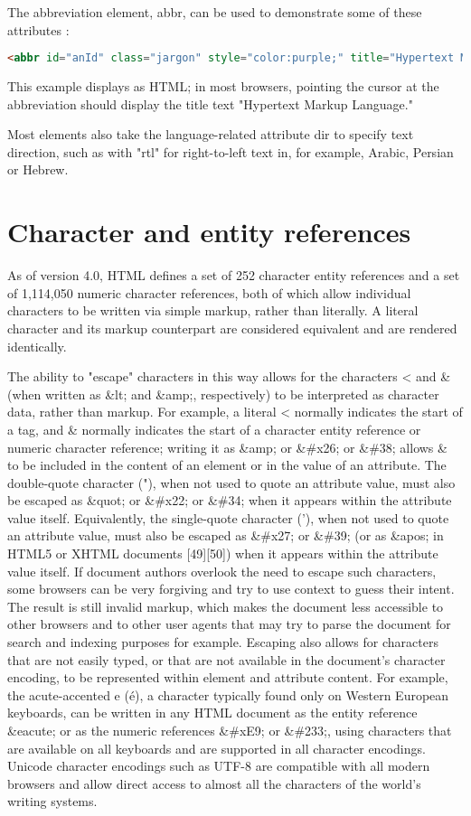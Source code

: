 The abbreviation element, abbr, can be used to demonstrate some of these attributes :

\begin{lstlisting}[language=HTML]
<abbr id="anId" class="jargon" style="color:purple;" title="Hypertext Markup Language">HTML</abbr>
\end{lstlisting}

This example displays as HTML; in most browsers, pointing the cursor at the abbreviation should display the title text "Hypertext Markup Language."

Most elements also take the language-related attribute dir to specify text direction, such as with "rtl" for right-to-left text in, for example, Arabic, Persian or Hebrew.


\section{Character and entity references}

As of version 4.0, HTML defines a set of 252 character entity references and a set of 1,114,050 numeric character references, both of which allow individual characters to be written via simple markup, rather than literally. A literal character and its markup counterpart are considered equivalent and are rendered identically.

The ability to "escape" characters in this way allows for the characters < and \& (when written as \&lt; and \&amp;, respectively) to be interpreted as character data, rather than markup. For example, a literal < normally indicates the start of a tag, and \& normally indicates the start of a character entity reference or numeric character reference; writing it as \&amp; or \&\#x26; or \&\#38; allows \& to be included in the content of an element or in the value of an attribute. The double-quote character ("), when not used to quote an attribute value, must also be escaped as \&quot; or \&\#x22; or \&\#34; when it appears within the attribute value itself. Equivalently, the single-quote character ('), when not used to quote an attribute value, must also be escaped as \&\#x27; or \&\#39; (or as \&apos; in HTML5 or XHTML documents [49][50]) when it appears within the attribute value itself. If document authors overlook the need to escape such characters, some browsers can be very forgiving and try to use context to guess their intent. The result is still invalid markup, which makes the document less accessible to other browsers and to other user agents that may try to parse the document for search and indexing purposes for example.
Escaping also allows for characters that are not easily typed, or that are not available in the document's character encoding, to be represented within element and attribute content. For example, the acute-accented e (é), a character typically found only on Western European keyboards, can be written in any HTML document as the entity reference \&eacute; or as the numeric references \&\#xE9; or \&\#233;, using characters that are available on all keyboards and are supported in all character encodings. Unicode character encodings such as UTF-8 are compatible with all modern browsers and allow direct access to almost all the characters of the world's writing systems.

